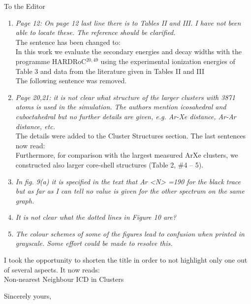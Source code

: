\documentclass[DIN,pagenumber=false,parskip=half,fromalign=left,fromphone=true,fromemail=true,fromurl=false,fromlogo=false,fromrule=false]{scrlttr2}
\begin{document}
\begin{letter}{To the Editor}
\begin{enumerate}
 \item \emph{Page 12:
       On page 12 last line there is to Tables II and III. I have not been able to locate these. The reference should be clarified.}\\
       The sentence has been changed to:\\
       In this work we evaluate the secondary energies and decay widths with
       the programme HARDRoC$^{20,49}$ using the experimental ionization energies
       of Table 3 and data from the literature given in Tables II and III
       {\color{blue}{of Ref. 34.}}\\
       The following sentence was removed.

 \item \emph{Page 20,21:
       it is not clear what structure of the larger clusters with 3871 atoms is used in the simulation. The authors mention icosahedral and cuboctahedral but no further details are given, e.g. Ar-Xe distance, Ar-Ar distance, etc.}\\
       The details were added to the Cluster Structures section. The last
       sentences now read:\\
       Furthermore, for comparison with the largest measured ArXe clusters,
       we constructed also larger core-shell structures (Table 2, \#4 – 5).
       {}

 \item \emph{In fig. 9(a) it is specified in the text that  Ar <N> =190 for the black trace but as far as I can tell no value is given for the other spectrum on the same graph.}

 \item \emph{It is not clear what the dotted lines in Figure 10 are?}

 \item \emph{The colour schemes of some of the figures lead to confusion when printed in grayscale. Some effort could be made to resolve this.}

\end{enumerate}


I took the opportunity to shorten the title in order to not highlight only
one out of several aspects. It now reads:\\
      Non-nearest Neighbour ICD in 
      Clusters


        \closing{Sincerely yours,}
	\end{letter}
\end{document}

